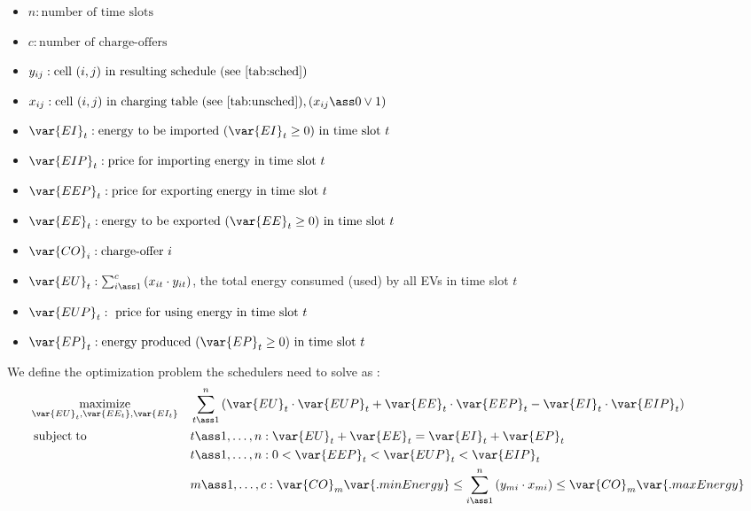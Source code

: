 \begin{itemize}
  \item $n : \text{number of time slots}$
  \item $c : \text{number of charge-offers}$
  \item $y_{ij} : \text{cell } (i, j) \text{ in resulting schedule (see \Cref{tab:sched})}$
  \item $x_{ij} : \text{cell } (i, j) \text{ in charging table (see \Cref{tab:unsched})}, (x_{ij} \ass 0 \vee 1)$
  \item $\var{EI}_t : \text{energy to be imported }(\var{EI}_t \geq 0) \text{ in time slot } t$
  \item $\var{EIP}_t : \text{price for importing energy in time slot } t$
  \item $\var{EEP}_t : \text{price for exporting energy in time slot } t$
  \item $\var{EE}_t : \text{energy to be exported }(\var{EE}_t \geq 0) \text{ in time slot } t$
  \item $\var{CO}_i : \text{charge-offer } i$
  \item $\var{EU}_t : \sum_{i \ass 1}^{c} \left(x_{it} \cdot y_{it}\right)$, the total energy consumed (used) by all EVs in time slot $t$
  \item $\var{EUP}_t : \text{ price for using energy in time slot } t$
  \item $\var{EP}_t : \text{energy produced } (\var{EP}_t \geq 0) \text{ in time slot } t$ 
\end{itemize}

We define the optimization problem the schedulers need to solve as :
\begin{equation}\label{eq:opprob}
  \begin{aligned}
    & \underset{\var{EU}_t, \var{EE_t}, \var{EI_t}}{\operatorname{maximize}} & & \sum_{t \ass 1}^n \left(\var{EU}_t \cdot \var{EUP}_t + \var{EE}_t \cdot \var{EEP}_t - \var{EI}_t \cdot \var{EIP}_t\right) \\
    & \operatorname{subject\;to} & & t \ass 1, \dots, n : \var{EU}_t+\var{EE}_t = \var{EI}_t + \var{EP}_t \\
    & & & t \ass 1, \dots, n : 0 < \var{EEP}_t < \var{EUP}_t < \var{EIP}_t \\
    & & &   m \ass 1, \dots, c : \var{CO}_m\var{.minEnergy} \leq  \sum_{i \ass 1}^{n} \left( y_{mi} \cdot x_{mi} \right) \leq \var{CO}_m\var{.maxEnergy}
  \end{aligned}
\end{equation}

